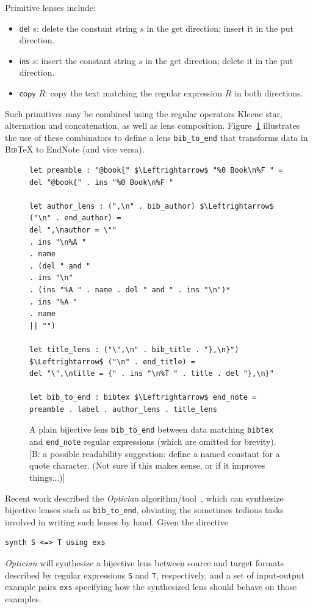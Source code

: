 \documentclass[acmsmall,review,anonymous]{acmart}
\newcommand{\FINISH}[3]{\ifdraft\textcolor{#1}{[#2: #3]}\fi}
\newcommand{\bcp}[1]{\FINISH{dkred}{B}{#1}}
\newcommand{\codefont}[1]{\ensuremath{\mathsf{#1}}}
\newcommand{\kw}[1]{\codefont{#1}}
\newcommand{\bibtex}{\textsc{Bib}\TeX{}}
\newcommand{\cd}[1]{\lstinline[backgroundcolor=\color{white}]$#1$}
\begin{document}
Primitive lenses include:
\begin{itemize}
  \item \kw{del} $s$: delete the constant string $s$ in the get
  direction; insert it in the put direction.
  \item \kw{ins} $s$: insert the constant string $s$ in the get
  direction; delete it in the put direction.
  \item \kw{copy} $R$: copy the text matching the regular expression $R$ in
  both directions.
\end{itemize}
Such primitives may be combined using the regular operators
Kleene star, alternation and concatenation, as well as lens composition.
Figure~\ref{fig:example-lens} illustrates the use of these
combinators to define a lens \cd{bib_to_end} that transforms data
in \bibtex{} to EndNote (and vice versa). 
\begin{figure}[t]
\begin{lstlisting}
let preamble : "@book{" $\Leftrightarrow$ "%0 Book\n%F " =
del "@book{" . ins "%0 Book\n%F "

let author_lens : (",\n" . bib_author) $\Leftrightarrow$ ("\n" . end_author) =
del ",\nauthor = \""
. ins "\n%A "
. name
. (del " and "
. ins "\n"
. (ins "%A " . name . del " and " . ins "\n")*
. ins "%A "
. name
|| "")

let title_lens : ("\",\n" . bib_title . "},\n}") $\Leftrightarrow$ ("\n" . end_title) =
del "\",\ntitle = {" . ins "\n%T " . title . del "},\n}"

let bib_to_end : bibtex $\Leftrightarrow$ end_note = preamble . label . author_lens . title_lens
\end{lstlisting}
\caption{A plain bijective lens \cd{bib_to_end} between data
matching \cd{bibtex} and \cd{end_note} regular 
expressions (which are omitted for brevity).  
\iflastminute
\bcp{a possible readability suggestion: define a named constant for a quote
  character.  (Not sure if this makes sense, or if it improves things...)}
\fi}
\label{fig:example-lens}
\end{figure}

Recent work described the {\em Optician}
algorithm/tool~\cite{optician}, which can synthesize bijective lenses
such as \cd{bib_to_end}, obviating the sometimes tedious tasks
involved in writing such lenses by hand.  Given the directive
\begin{lstlisting}
synth S <=> T using exs
\end{lstlisting}
\noindent
{\em Optician} will synthesize a bijective lens between 
source and target formats described by regular expressions
\cd{S} and \cd{T}, respectively, and a set of input-output example pairs \cd{exs} specifying how
the synthesized lens should behave on those examples.
\end{document}
